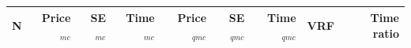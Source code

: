 \begin{tabular}{rrrrrrrrr}
\toprule
N & Price$_{mc}$ & SE$_{mc}$ & Time$_{mc}$ & Price$_{qmc}$ & SE$_{qmc}$ & Time$_{qmc}$ & VRF & Time ratio \\
\midrule
\bottomrule
\end{tabular}
